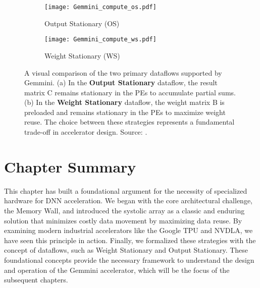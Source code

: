 \begin{figure}[htbp]
    \centering
    \begin{subfigure}[b]{0.48\textwidth}
        \centering
        \texttt{[image: Gemmini\_compute\_os.pdf]}
        \caption{Output Stationary (OS)}
        \label{fig:os_dataflow}
    \end{subfigure}
    \hfill
    \begin{subfigure}[b]{0.48\textwidth}
        \centering
        \texttt{[image: Gemmini\_compute\_ws.pdf]}
        \caption{Weight Stationary (WS)}
        \label{fig:ws_dataflow}
    \end{subfigure}
    \caption[Comparison of OS and WS Dataflows]{A visual comparison of the two primary dataflows supported by Gemmini. (a) In the \textbf{Output Stationary} dataflow, the result matrix C remains stationary in the PEs to accumulate partial sums. (b) In the \textbf{Weight Stationary} dataflow, the weight matrix B is preloaded and remains stationary in the PEs to maximize weight reuse. The choice between these strategies represents a fundamental trade-off in accelerator design. Source: \cite{gemini-dac}.}
    \label{fig:dataflow_comparison}
\end{figure}

\section{Chapter Summary}
This chapter has built a foundational argument for the necessity of specialized hardware for DNN acceleration. We began with the core architectural challenge, the Memory Wall, and introduced the systolic array as a classic and enduring solution that minimizes costly data movement by maximizing data reuse. By examining modern industrial accelerators like the Google TPU and NVDLA, we have seen this principle in action. Finally, we formalized these strategies with the concept of dataflows, such as Weight Stationary and Output Stationary. These foundational concepts provide the necessary framework to understand the design and operation of the Gemmini accelerator, which will be the focus of the subsequent chapters.